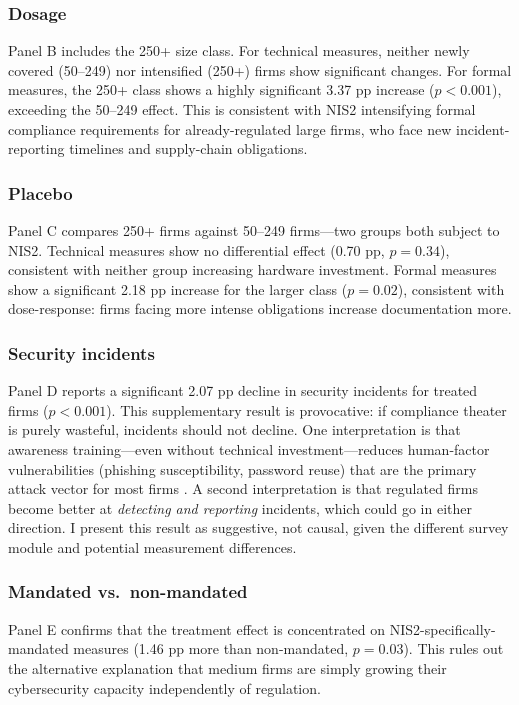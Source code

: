 \documentclass[12pt]{article}
\begin{document}
\subsubsection*{Dosage} Panel B includes the 250+ size class. For technical measures, neither newly covered (50--249) nor intensified (250+) firms show significant changes. For formal measures, the 250+ class shows a highly significant 3.37 pp increase ($p < 0.001$), exceeding the 50--249 effect. This is consistent with NIS2 intensifying formal compliance requirements for already-regulated large firms, who face new incident-reporting timelines and supply-chain obligations.

\subsubsection*{Placebo} Panel C compares 250+ firms against 50--249 firms---two groups both subject to NIS2. Technical measures show no differential effect (0.70 pp, $p = 0.34$), consistent with neither group increasing hardware investment. Formal measures show a significant 2.18 pp increase for the larger class ($p = 0.02$), consistent with dose-response: firms facing more intense obligations increase documentation more.

\subsubsection*{Security incidents} Panel D reports a significant 2.07 pp decline in security incidents for treated firms ($p < 0.001$). This supplementary result is provocative: if compliance theater is purely wasteful, incidents should not decline. One interpretation is that awareness training---even without technical investment---reduces human-factor vulnerabilities (phishing susceptibility, password reuse) that are the primary attack vector for most firms \citep{enisa2024threat}. A second interpretation is that regulated firms become better at \textit{detecting and reporting} incidents, which could go in either direction. I present this result as suggestive, not causal, given the different survey module and potential measurement differences.

\subsubsection*{Mandated vs.\ non-mandated} Panel E confirms that the treatment effect is concentrated on NIS2-specifically-mandated measures (1.46 pp more than non-mandated, $p = 0.03$). This rules out the alternative explanation that medium firms are simply growing their cybersecurity capacity independently of regulation.
\end{document}
